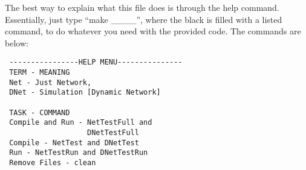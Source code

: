 \documentclass{article}
\numberwithin{equation}{section} %
\theoremstyle{definition}
\begin{document}
\begin{multicols*}{2}
The best way to explain what this file does is through the help command. Essentially, just type ``make \_\_\_\_'', where the black is filled with a listed command, to do whatever you need with the provided code. The commands are below:
\begin{lstlisting}
 ----------------HELP MENU---------------
 TERM - MEANING
 Net - Just Network,
 DNet - Simulation [Dynamic Network]
 
 TASK - COMMAND
 Compile and Run - NetTestFull and
                   DNetTestFull
 Compile - NetTest and DNetTest
 Run - NetTestRun and DNetTestRun
 Remove Files - clean
\end{lstlisting}

\end{multicols*}
\end{document}
